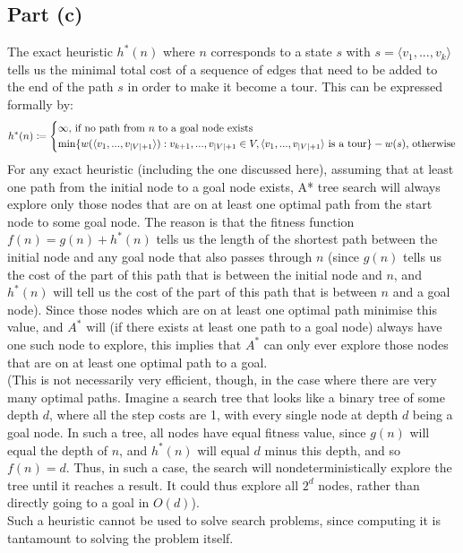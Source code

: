 \documentclass[a4paper,12pt]{scrartcl}
\begin{document}
\subsection*{Part (c)}
The exact heuristic $h^*(n)$ where $n$ corresponds to a state $s$ with $s = \langle v_1, ..., v_k \rangle$ tells us the minimal total cost of a sequence of edges that need to be added to the end of the path $s$ in order to make it become a tour. This can be expressed formally by:
\[
    h^*(n) \coloneqq
    \begin{dcases}
        \infty \text{, if no path from $n$ to a goal node exists} \\
        \min \{ w(\langle v_1, ..., v_{|V|+1} \rangle) : v_{k+1}, ..., v_{|V|+1} \in V, \langle v_1, ..., v_{|V|+1} \rangle \text{ is a tour} \} - w(s) \text{, otherwise}
    \end{dcases}
\]
For any exact heuristic (including the one discussed here), assuming that at least one path from the initial node to a goal node exists, A* tree search will always explore only those nodes that are on at least one optimal path from the start node to some goal node. The reason is that the fitness function $f(n) = g(n) + h^*(n)$ tells us the length of the shortest path between the initial node and any goal node that also passes through $n$ (since $g(n)$ tells us the cost of the part of this path that is between the initial node and $n$, and $h^*(n)$ will tell us the cost of the part of this path that is between $n$ and a goal node). Since those nodes which are on at least one optimal path minimise this value, and $A^*$ will (if there exists at least one path to a goal node) always have one such node to explore, this implies that $A^*$ can only ever explore those nodes that are on at least one optimal path to a goal. \\
(This is not necessarily very efficient, though, in the case where there are very many optimal paths. Imagine a search tree that looks like a binary tree of some depth $d$, where all the step costs are 1, with every single node at depth $d$ being a goal node. In such a tree, all nodes have equal fitness value, since $g(n)$ will equal the depth of $n$, and $h^*(n)$ will equal $d$ minus this depth, and so $f(n) = d$. Thus, in such a case, the search will nondeterministically explore the tree until it reaches a result. It could thus explore all $2^d$ nodes, rather than directly going to a goal in $O(d)$). \\
Such a heuristic cannot be used to solve search problems, since computing it is tantamount to solving the problem itself.
\end{document}
